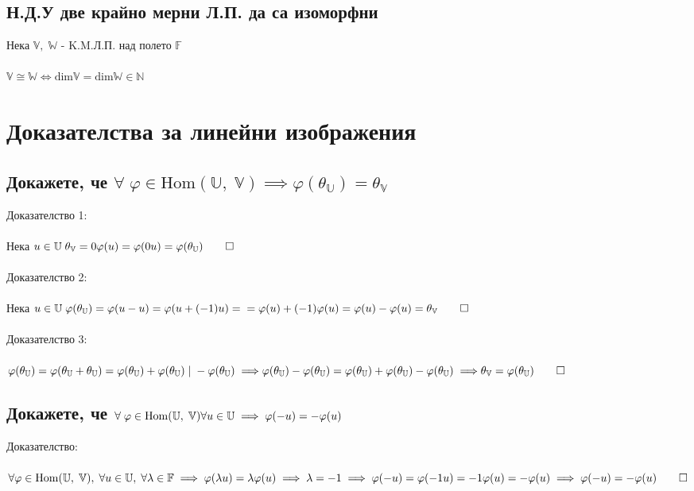 \documentclass{article}
\newcommand{\V}{\mathbb{V}}
\newcommand{\N}{\mathbb{N}}
\newcommand{\F}{\mathbb{F}}
\newcommand{\W}{\mathbb{W}}
\newcommand{\UV}{\mathbb{U}}
\newcommand{\OV}{\theta}
\begin{document}
    \subsection{Н.Д.У две крайно мерни Л.П. да са изоморфни}
    Нека \(\V, \; \W\) - K.M.Л.П. над полето \(\F\) \\\\
    \(\V \cong \W \iff \mathrm{dim}\V = \mathrm{dim}\W \in \N\)
    \section{Доказателства за линейни изображения}
    \subsection{Докажете, че \(\forall \; \varphi \in \mathrm{Hom}(\UV, \; \V) \implies \varphi(\OV_\UV) = \OV_\V\)}
    Доказателство 1: \\\\
    Нека \(u \in \UV \; \OV_\V = 0\varphi(u) = \varphi(0u) = \varphi(\OV_\UV) \qed \) \\\\
    Доказателство 2: \\\\
    Нека \(u \in \UV \; \varphi(\OV_\UV) = \varphi(u - u) = \varphi(u + (-1)u) = \\\\
    = \varphi(u) + (-1)\varphi(u) = \varphi(u) - \varphi(u) = \OV_\V \qed \) \\\\
    Доказателство 3: \\\\
    \(\varphi(\OV_\UV) = \varphi(\OV_\UV + \OV_\UV) = \varphi(\OV_\UV) + \varphi(\OV_\UV) \; | \; -\varphi(\OV_\UV) \implies \\\\
    \varphi(\OV_\UV) - \varphi(\OV_\UV) = \varphi(\OV_\UV) + \varphi(\OV_\UV) - \varphi(\OV_\UV) \implies \\\\
    \OV_\V = \varphi(\OV_\UV) \qed \)
    \subsection{Докажете, че \(\forall \; \varphi \in \mathrm{Hom}(\UV, \; \V) \\
    \forall u \in \UV \implies \varphi(-u) = -\varphi(u)\)}
    Доказателство: \\\\
    \(\forall \varphi \in \mathrm{Hom}(\UV, \; \V), \; \forall u \in \UV, \; \forall \lambda \in \F \implies \varphi(\lambda u) = \lambda \varphi(u) \\\\
    \implies \lambda = -1 \implies \varphi(-u) = \varphi(-1u) = -1\varphi(u) = -\varphi(u) \\\\
    \implies \varphi(-u) = -\varphi(u) \qed\)
\end{document}
